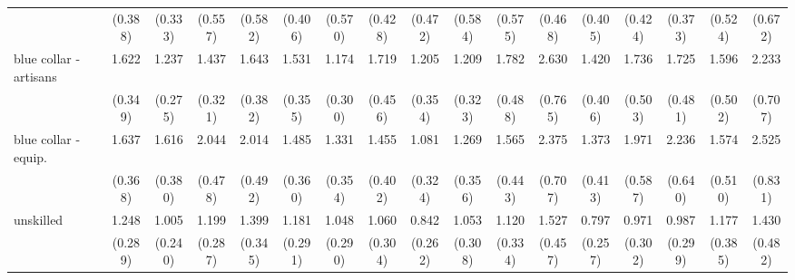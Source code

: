 {\begin{tabular}{l*{16}{c}}
                    &     (0.388)         &     (0.333)         &     (0.557)         &     (0.582)         &     (0.406)         &     (0.570)         &     (0.428)         &     (0.472)         &     (0.584)         &     (0.575)         &     (0.468)         &     (0.405)         &     (0.424)         &     (0.373)         &     (0.524)         &     (0.672)         \\
[1em]
blue collar - artisans&       1.622\sym{*}  &       1.237         &       1.437         &       1.643\sym{*}  &       1.531         &       1.174         &       1.719\sym{*}  &       1.205         &       1.209         &       1.782\sym{*}  &       2.630\sym{***}&       1.420         &       1.736         &       1.725         &       1.596         &       2.233\sym{*}  \\
                    &     (0.349)         &     (0.275)         &     (0.321)         &     (0.382)         &     (0.355)         &     (0.300)         &     (0.456)         &     (0.354)         &     (0.323)         &     (0.488)         &     (0.765)         &     (0.406)         &     (0.503)         &     (0.481)         &     (0.502)         &     (0.707)         \\
[1em]
blue collar - equip.&       1.637\sym{*}  &       1.616\sym{*}  &       2.044\sym{**} &       2.014\sym{**} &       1.485         &       1.331         &       1.455         &       1.081         &       1.269         &       1.565         &       2.375\sym{**} &       1.373         &       1.971\sym{*}  &       2.236\sym{**} &       1.574         &       2.525\sym{**} \\
                    &     (0.368)         &     (0.380)         &     (0.478)         &     (0.492)         &     (0.360)         &     (0.354)         &     (0.402)         &     (0.324)         &     (0.356)         &     (0.443)         &     (0.707)         &     (0.413)         &     (0.587)         &     (0.640)         &     (0.510)         &     (0.831)         \\
[1em]
unskilled           &       1.248         &       1.005         &       1.199         &       1.399         &       1.181         &       1.048         &       1.060         &       0.842         &       1.053         &       1.120         &       1.527         &       0.797         &       0.971         &       0.987         &       1.177         &       1.430         \\
                    &     (0.289)         &     (0.240)         &     (0.287)         &     (0.345)         &     (0.291)         &     (0.290)         &     (0.304)         &     (0.262)         &     (0.308)         &     (0.334)         &     (0.457)         &     (0.257)         &     (0.302)         &     (0.299)         &     (0.385)         &     (0.482)         \\

\end{tabular}}

